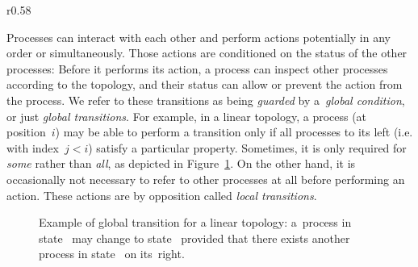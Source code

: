 %
\begin{wrapfigure}{r}{0.58\linewidth}
  \hfill%
  \vspace{-1em}
\end{wrapfigure}
%
%
%
%
Processes can interact with each other and perform actions potentially
in any order or %
simultaneously. %
Those actions are conditioned on the status of the other processes:
Before it performs its action, a process can inspect other processes
according to the topology, and their status can allow or prevent the
action from the process.
% 
We refer to these transitions as being \emph{guarded} by
a~\emph{global condition}, or just \emph{global transitions}. %
% 
For example, in a linear topology, a process (at position~$i$) may be
able to perform a transition only if all processes to its left
(i.e. with index~$j<i$) satisfy a particular property.
%
Sometimes, it is only required for \emph{some} rather than \emph{all},
as depicted in Figure~\ref{figure:example:transition}.
% 
%
%
On the other hand, it is occasionally not necessary to refer to other
processes at all before performing an action. %
% 
These actions are by opposition called \emph{local transitions}.

\begingroup%
\setlength\intextsep{\dazintextsep}
\begin{figure}[b]%
  \begin{minipage}{0.56\linewidth}
    \noindent%
  \end{minipage}\begin{minipage}{0.44\linewidth}
    \caption{Example of global transition for a linear topology:
      a~process in state~ may change to state~ provided
      that there exists another process in state~ on
      its~right.}
    \label{figure:example:transition}
  \end{minipage}
\end{figure}
\endgroup


